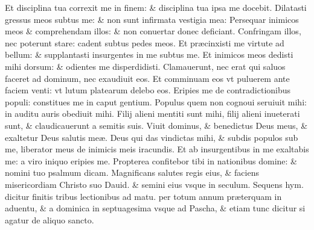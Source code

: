\documentclass[a5paper,10pt]{book}
\def\ae{æ}
\begin{document}
\begin{multicols*}{2}
\newline \color{red} E\color{black}t disciplina tua correxit me in finem: \& disciplina tua ipsa me docebit.
\newline \color{red} D\color{black}ilatasti gressus meos subtus me: \& non sunt infirmata vestigia mea:
\newline \color{red} P\color{black}ersequar inimicos meos \& comprehendam illos: \& non conuertar donec deficiant.
\newline \color{red} C\color{black}onfringam illos, nec poterunt stare: cadent subtus pedes meos.
\newline \color{red} E\color{black}t pr\ae cinxisti me virtute ad bellum: \& supplantasti insurgentes in me subtus me.
\newline \color{red} E\color{black}t inimicos meos dedisti mihi dorsum: \& odientes me disperdidisti.
\newline \color{red} C\color{black}lamauerunt, nec erat qui saluos faceret ad dominum, nec exaudiuit eos.
\newline \color{red} E\color{black}t comminuam eos vt puluerem ante faciem venti: vt lutum platearum delebo eos.%
\newline \color{red} E\color{black}ripies me de contradictionibus populi: constitues me in caput gentium.
\newline \color{red} P\color{black}opulus quem non cognoui seruiuit mihi: in auditu auris obediuit mihi.
\newline \color{red} F\color{black}ilij alieni mentiti sunt mihi, filij alieni inueterati sunt, \& claudicauerunt a semitis suis.
\newline \color{red} V\color{black}iuit dominus, \& benedictus Deus meus, \& exaltetur Deus salutis me\ae .
\newline \color{red} D\color{black}eus qui das vindictas mihi, \& subdis populos sub me, liberator meus de inimicis meis iracundis.
\newline \color{red} E\color{black}t ab insurgentibus in me exaltabis me: a viro iniquo eripies me.
\newline \color{red} P\color{black}ropterea confitebor tibi in nationibus domine: \& nomini tuo psalmum dicam.
\newline \color{red} M\color{black}agnificans salutes regis eius, \& faciens misericordiam Christo suo Dauid. \& semini eius vsque in seculum.
\newline {} \color{red} Sequens hym. dicitur %
finitis tribus lectionibus ad matu. per totum annum pr\ae terquam in aduentu, \& a dominica in septuagesima vsque ad Pascha, \& etiam tunc dicitur si agatur de aliquo sancto. \color{black}

\end{multicols*}
\end{document}
